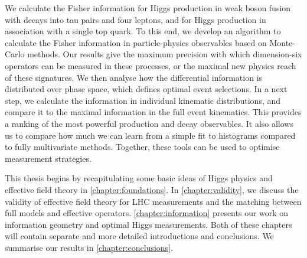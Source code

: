 We calculate the Fisher information for Higgs production in weak boson
fusion with decays into tau pairs and four leptons, and for Higgs
production in association with a single top quark. To this end, we
develop an algorithm to calculate the Fisher information in
particle-physics observables based on Monte-Carlo methods. Our results
give the maximum precision with which dimension-six operators can be
measured in these processes, or the maximal new physics reach of these
signatures. We then analyse how the differential information is
distributed over phase space, which defines optimal event
selections. In a next step, we calculate the information in individual
kinematic distributions, and compare it to the maximal information in
the full event kinematics. This provides a ranking of the most
powerful production and decay observables. It also allows us to
compare how much we can learn from a simple fit to histograms compared
to fully multivariate methods. Together, these tools can be used to
optimise measurement strategies.

\newparagraph
%
This thesis begins by recapitulating some basic ideas of Higgs physics
and effective field theory in \autoref{chapter:foundations}. In
\autoref{chapter:validity}, we discuss the validity of effective field
theory for LHC measurements and the matching between full models and
effective operators. \autoref{chapter:information} presents our work
on information geometry and optimal Higgs measurements. Both of these
chapters will contain separate and more detailed introductions and
conclusions. We summarise our results in
\autoref{chapter:conclusions}.
